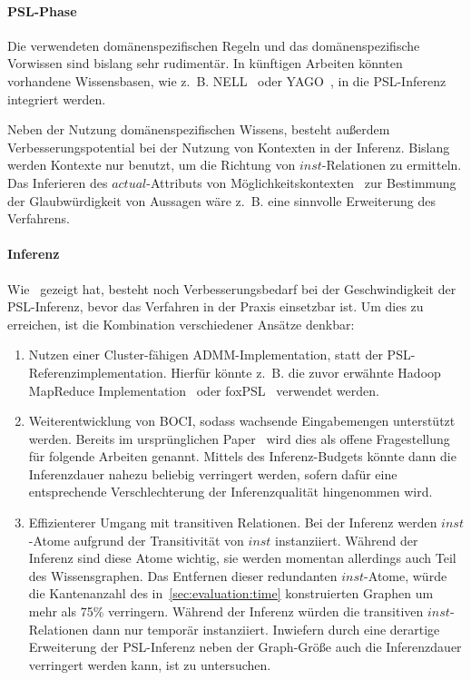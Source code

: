 \paragraph{PSL-Phase}
Die verwendeten domänenspezifischen Regeln und das domänenspezifische Vorwissen sind bislang sehr rudimentär.
In künftigen Arbeiten könnten vorhandene Wissensbasen, wie z.~B. NELL~\cite{Carlson2010} oder YAGO~\cite{YAGO}, in die PSL-Inferenz integriert werden.

Neben der Nutzung domänenspezifischen Wissens, besteht außerdem Verbesserungspotential bei der Nutzung von Kontexten in der Inferenz.
Bislang werden Kontexte nur benutzt, um die Richtung von $inst$-Relationen zu ermitteln.
Das Inferieren des $actual$-Attributs von Möglichkeitskontexten~ zur Bestimmung der Glaubwürdigkeit von Aussagen wäre z.~B. eine sinnvolle Erweiterung des Verfahrens.

\paragraph{Inferenz}
Wie~ gezeigt hat, besteht noch Verbesserungsbedarf bei der Geschwindigkeit der PSL-Inferenz, bevor das Verfahren in der Praxis einsetzbar ist.
Um dies zu erreichen, ist die Kombination verschiedener Ansätze denkbar:
\begin{enumerate}
	\item Nutzen einer Cluster-fähigen ADMM-Implementation, statt der PSL-Referenz\-implementation.
		Hierfür könnte z.~B. die zuvor erwähnte Hadoop MapReduce Implementation~\cite{Lubell-Doughtie2013} oder foxPSL~\cite{Magliacane2015} verwendet werden.
	\item Weiterentwicklung von BOCI, sodass wachsende Eingabemengen unterstützt werden.
		Bereits im ursprünglichen Paper~\cite[Abschnitt 6]{Pujara2015} wird dies als offene Fragestellung für folgende Arbeiten genannt.
		Mittels des Inferenz-Budgets könnte dann die Inferenzdauer nahezu beliebig verringert werden, sofern dafür eine entsprechende Verschlechterung der Inferenzqualität hingenommen wird.
	\item Effizienterer Umgang mit transitiven Relationen.
		Bei der Inferenz werden $inst$-Atome aufgrund der Transitivität von $inst$ instanziiert.
		Während der Inferenz sind diese Atome wichtig, sie werden momentan allerdings auch Teil des Wissensgraphen.
		Das Entfernen dieser redundanten $inst$-Atome, würde die Kantenanzahl des in~\ref{sec:evaluation:time} konstruierten Graphen um mehr als 75\% verringern.
		Während der Inferenz würden die transitiven $inst$-Relationen dann nur temporär instanziiert.
		Inwiefern durch eine derartige Erweiterung der PSL-Inferenz neben der Graph-Größe auch die Inferenzdauer verringert werden kann, ist zu untersuchen.
\end{enumerate}


